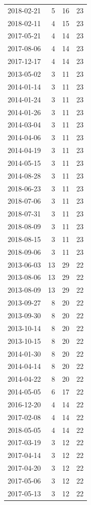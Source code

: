 \begin{tabular}{lrrr}
2018-02-21 & 5 & 16 & 23 \\
2018-02-11 & 4 & 15 & 23 \\
2017-05-21 & 4 & 14 & 23 \\
2017-08-06 & 4 & 14 & 23 \\
2017-12-17 & 4 & 14 & 23 \\
2013-05-02 & 3 & 11 & 23 \\
2014-01-14 & 3 & 11 & 23 \\
2014-01-24 & 3 & 11 & 23 \\
2014-01-26 & 3 & 11 & 23 \\
2014-03-04 & 3 & 11 & 23 \\
2014-04-06 & 3 & 11 & 23 \\
2014-04-19 & 3 & 11 & 23 \\
2014-05-15 & 3 & 11 & 23 \\
2014-08-28 & 3 & 11 & 23 \\
2018-06-23 & 3 & 11 & 23 \\
2018-07-06 & 3 & 11 & 23 \\
2018-07-31 & 3 & 11 & 23 \\
2018-08-09 & 3 & 11 & 23 \\
2018-08-15 & 3 & 11 & 23 \\
2018-09-06 & 3 & 11 & 23 \\
2013-06-03 & 13 & 29 & 22 \\
2013-08-06 & 13 & 29 & 22 \\
2013-08-09 & 13 & 29 & 22 \\
2013-09-27 & 8 & 20 & 22 \\
2013-09-30 & 8 & 20 & 22 \\
2013-10-14 & 8 & 20 & 22 \\
2013-10-15 & 8 & 20 & 22 \\
2014-01-30 & 8 & 20 & 22 \\
2014-04-14 & 8 & 20 & 22 \\
2014-04-22 & 8 & 20 & 22 \\
2014-05-05 & 6 & 17 & 22 \\
2016-12-20 & 4 & 14 & 22 \\
2017-02-08 & 4 & 14 & 22 \\
2018-05-05 & 4 & 14 & 22 \\
2017-03-19 & 3 & 12 & 22 \\
2017-04-14 & 3 & 12 & 22 \\
2017-04-20 & 3 & 12 & 22 \\
2017-05-06 & 3 & 12 & 22 \\
2017-05-13 & 3 & 12 & 22 \\

\end{tabular}
